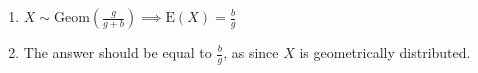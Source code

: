 \begin{enumerate}[label=(\alph*)]
\item $X \sim \text{Geom}(\frac{g}{g+b}) \implies \text{E}(X) = \frac{b}{g}$

\item The answer should be equal to $\frac{b}{g}$, as since $X$ is geometrically
distributed.

\end{enumerate}